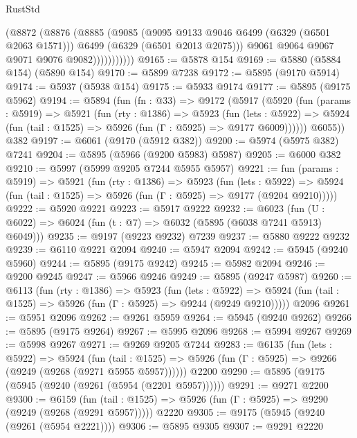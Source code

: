 \begin{lexlean}{RustStd}
\begin{coremodule}
{{                    (@8872
                      (@8876
                        (@8885
                          (@9085
                            (@9095 @9133 @9046 @6499 (@6329 (@6501 @2063 @1571)))
                            @6499
                            (@6329 (@6501 @2013 @2075)))
                          @9061
                          @9064
                          @9067
                          @9071
                          @9076
                          @9082)))))))))))
@9165 := @5878 @154
@9169 := @5880 (@5884 @154) (@5890 @154)
@9170 := @5899 @7238
@9172 := @5895 (@9170 @5914)
@9174 := @5937 (@5938 @154)
@9175 := @5933 @9174
@9177 := @5895 (@9175 @5962)
@9194 := @5894
    (fun (fn : @33) =>
    @9172
      (@5917
        (@5920
          (fun (params : @5919) =>
          @5921
            (fun (rty : @1386) =>
            @5923
              (fun (lets : @5922) =>
              @5924 (fun (tail : @1525) => @5926 (fun (Γ : @5925) => @9177 @6009))))))
        @6055))
    @382
@9197 := @6061 (@9170 (@5912 @382))
@9200 := @5974 (@5975 @382) @7241
@9204 := @5895 (@5966 (@9200 @5983) @5987)
@9205 := @6000 @382
@9210 := @5997 (@5999 @9205 @7244 @5955 @5957)
@9221 := fun (params : @5919) =>
  @5921
    (fun (rty : @1386) =>
    @5923
      (fun (lets : @5922) =>
      @5924 (fun (tail : @1525) => @5926 (fun (Γ : @5925) => @9177 (@9204 @9210)))))
@9222 := @5920 @9221
@9223 := @5917 @9222
@9232 := @6023 (fun (U : @6022) => @6024 (fun (t : @7) => @6032 (@5895 (@6038 @7241 @5913) @6049)))
@9235 := @9197 (@9223 @9232) @7239
@9237 := @5880 @9222 @9232
@9239 := @6110 @9221 @2094
@9240 := @5947 @2094
@9242 := @5945 (@9240 @5960)
@9244 := @5895 (@9175 @9242)
@9245 := @5982 @2094
@9246 := @9200 @9245
@9247 := @5966 @9246
@9249 := @5895 (@9247 @5987)
@9260 := @6113
    (fun (rty : @1386) =>
    @5923
      (fun (lets : @5922) =>
      @5924 (fun (tail : @1525) => @5926 (fun (Γ : @5925) => @9244 (@9249 @9210)))))
    @2096
@9261 := @5951 @2096
@9262 := @9261 @5959
@9264 := @5945 (@9240 @9262)
@9266 := @5895 (@9175 @9264)
@9267 := @5995 @2096
@9268 := @5994 @9267
@9269 := @5998 @9267
@9271 := @9269 @9205 @7244
@9283 := @6135
    (fun (lets : @5922) =>
    @5924
      (fun (tail : @1525) => @5926 (fun (Γ : @5925) => @9266 (@9249 (@9268 (@9271 @5955 @5957))))))
    @2200
@9290 := @5895 (@9175 (@5945 (@9240 (@9261 (@5954 (@2201 @5957))))))
@9291 := @9271 @2200
@9300 := @6159
    (fun (tail : @1525) => @5926 (fun (Γ : @5925) => @9290 (@9249 (@9268 (@9291 @5957)))))
    @2220
@9305 := @9175 (@5945 (@9240 (@9261 (@5954 @2221))))
@9306 := @5895 @9305
@9307 := @9291 @2220
}}
\end{coremodule}
\end{lexlean}
